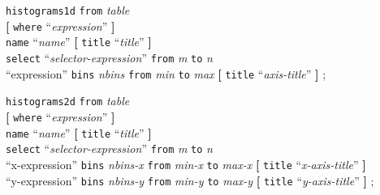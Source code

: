 \documentclass[12pt]{article}
\begin{document}
\begin{flushleft}
{\tt histograms1d} {\tt from} {\em table} \\
\hspace{1cm}  {\bf[} {\tt where} ``{\em expression}'' {\bf]} \\
\hspace{1cm}  {\tt name} ``{\em name}'' {\bf[} {\tt title} ``{\em title}'' {\bf]} \\
\hspace{1cm}  {\tt select} ``{\em selector-expression}'' {\tt from} {\em m} {\tt to} {\em n} \\ 
\hspace{1cm}  ``expression'' {\tt bins} {\em nbins} {\tt from} {\em min} {\tt to} {\em max} {\bf[} {\tt title}  ``{\em axis-title}'' {\bf]} ;
\end{flushleft}
\vspace{5mm}

\begin{flushleft}
{\tt histograms2d} {\tt from} {\em table} \\
\hspace{1cm}  {\bf[} {\tt where} ``{\em expression}'' {\bf]} \\
\hspace{1cm}  {\tt name} ``{\em name}'' {\bf[} {\tt title} ``{\em title}'' {\bf]} \\
\hspace{1cm}  {\tt select} ``{\em selector-expression}'' {\tt from} {\em m} {\tt to} {\em n} \\ 
\hspace{1cm} ``x-expression'' {\tt bins} {\em nbins-x} {\tt from} {\em min-x} {\tt to} {\em max-x} {\bf[} {\tt title}  ``{\em x-axis-title}'' {\bf]} \\
\hspace{1cm}  ``y-expression'' {\tt bins} {\em nbins-y} {\tt from} {\em min-y} {\tt to} {\em max-y} {\bf[} {\tt title}  ``{\em y-axis-title}'' {\bf]} ;
\end{flushleft}
\vspace{5mm}
\end{document}
